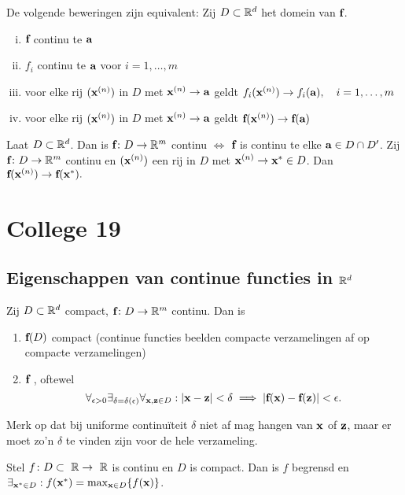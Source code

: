 \documentclass{2wa40summary}
\begin{document}
	 De volgende beweringen zijn equivalent: Zij $D\subset\mathbb{R}^d$ het domein van ${\textbf{f}}$.
	\begin{enumerate}[(i)]
		\item ${\textbf{f}}$ continu te ${\textbf{a}}$
		\item $f_i$ continu te ${\textbf{a}}$ voor $i=1,\ldots,m$
		\item voor elke rij $({\textbf{x}}^{(n)})$ in $D$ met ${\textbf{x}}^{(n)}\to{\textbf{a}}$ geldt $f_i({\textbf{x}}^{(n)}) \to f_i({\textbf{a}}),\quad i=1,\ldots,m$
		\item voor elke rij $({\textbf{x}}^{(n)})$ in $D$ met ${\textbf{x}}^{(n)}\to{\textbf{a}}$ geldt ${\textbf{f}}({\textbf{x}}^{(n)})\to{\textbf{f}}({\textbf{a}})$
	\end{enumerate}
	
	Laat $D \subset \mathbb{R}^d$. Dan is ${\textbf{f}}\colon D \to \mathbb{R}^m$ continu $\iff$ ${\textbf{f}}$ is continu te elke ${\textbf{a}}\in D\cap D'$.
	\opm Zij ${\textbf{f}}\colon D\to \mathbb{R}^m$ continu en $({\textbf{x}}^{(n)})$ een rij in $D$ met ${\textbf{x}}^{(n)} \to {\textbf{x}}^* \in D$.
	Dan ${\textbf{f}}({\textbf{x}}^{(n)}) \to {\textbf{f}}({\textbf{x}}^*).$
	
	\newpage
	\section{College 19}
	\subsection{Eigenschappen van continue functies in $\mathbb{R}^d$}
	\begin{theorem}
		Zij $D \subset \mathbb{R}^d$ compact, ${\textbf{f}}\colon D\to\mathbb{R}^m$ continu. Dan is
		\begin{enumerate}[(1)]
			\item ${\textbf{f}}(D)$ compact (continue functies beelden compacte verzamelingen af op compacte verzamelingen)
			\item ${\textbf{f}}$ , oftewel
			\[\forall_{\epsilon > 0} \exists_{\delta = \delta(\epsilon)}\forall_{\x,\z\in D}:
			\abs{\x-\z}<\delta \implies |\f(\x)-\f(\z)|<\epsilon.
			\]
		\end{enumerate}
		\opm Merk op dat bij uniforme continu\"iteit $\delta$ niet af mag hangen van ${\textbf{x}}$ of ${\textbf{z}}$, maar er moet zo'n $\delta$ te vinden zijn voor de hele verzameling.
	\end{theorem}
	
	Stel $f\colon D\subset~\mathbb{R}\to~\mathbb{R}$ is continu
	en $D$ is compact. Dan is $f$ begrensd en $\exists_{{\textbf{x}}^* \in D}:f({\textbf{x}}^*)=\max_{{\textbf{x}}\in D}\lbrace f({\textbf{x}})\rbrace$.
	
\end{document}
